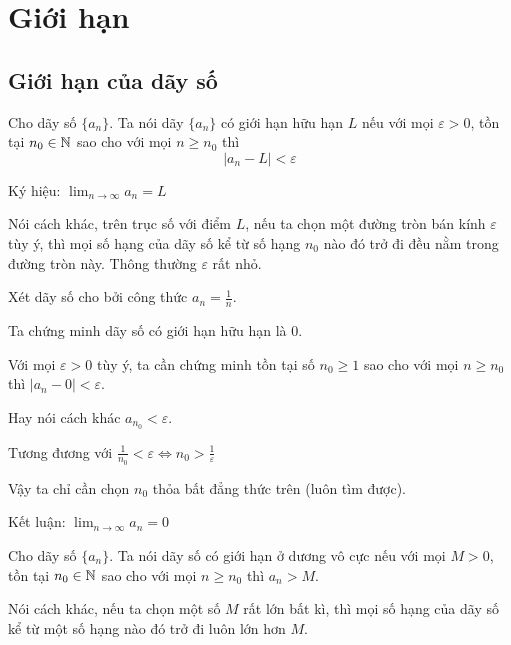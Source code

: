 \chapter{Giới hạn}

\section{Giới hạn của dãy số}

\begin{definition}
Cho dãy số $\{a_n\}$. Ta nói dãy $\{a_n\}$ có giới hạn hữu hạn $L$ nếu với mọi 
$\varepsilon > 0$, tồn tại $n_0 \in \mathbb{N}$ sao cho với mọi $n \geq n_0$ thì 
\[| a_{n} - L | < \varepsilon \]

Ký hiệu: $\displaystyle{\lim_{n \to \infty} a_n = L}$

\end{definition}

Nói cách khác, trên trục số với điểm $L$, nếu ta chọn một đường tròn bán kính $\varepsilon$ tùy ý,
thì mọi số hạng của dãy số kể từ số hạng $n_0$ nào đó trở đi đều nằm trong đường tròn này.
Thông thường $\varepsilon$ rất nhỏ.

\begin{example}
    Xét dãy số cho bởi công thức $a_n = \frac{1}{n}$.

    Ta chứng minh dãy số có giới hạn hữu hạn là 0.

    Với mọi $\varepsilon > 0$ tùy ý, ta cần chứng minh tồn tại
    số $n_0 \geq 1$ sao cho với mọi $n \geq n_0$ thì $| a_n - 0 | < \varepsilon$.

    Hay nói cách khác $a_{n_0} < \varepsilon$.

    Tương đương với $\frac{1}{n_0} < \varepsilon \Leftrightarrow n_0 > \frac{1}{\varepsilon}$

    Vậy ta chỉ cần chọn $n_0$ thỏa bất đẳng thức trên (luôn tìm được).

    Kết luận: $\displaystyle{\lim_{n \to \infty} a_n = 0}$
\end{example}

\begin{definition}
    Cho dãy số $\{a_n\}$. Ta nói dãy số có giới hạn ở dương vô cực
    nếu với mọi $M > 0$, tồn tại $n_0 \in \mathbb{N}$ sao cho với mọi $n \geq n_0$
    thì $a_n > M$.
\end{definition}

Nói cách khác, nếu ta chọn một số $M$ rất lớn bất kì, thì mọi số hạng
của dãy số kể từ một số hạng nào đó trở đi luôn lớn hơn $M$.

